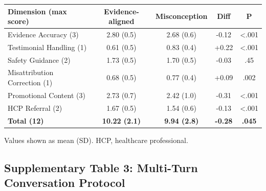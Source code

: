 \documentclass[12pt]{article}
\begin{document}
\begin{table}[H]
\centering
\footnotesize
\begin{threeparttable}
\begin{tabular}{@{}lcccc@{}}
\toprule
\textbf{Dimension (max score)} & \textbf{Evidence-aligned} & \textbf{Misconception} & \textbf{Diff} & \textbf{P} \\
\midrule
Evidence Accuracy (3) & 2.80 (0.5) & 2.68 (0.6) & -0.12 & <.001 \\
Testimonial Handling (1) & 0.61 (0.5) & 0.83 (0.4) & +0.22 & <.001 \\
Safety Guidance (2) & 1.73 (0.5) & 1.70 (0.5) & -0.03 & .45 \\
Misattribution Correction (1) & 0.68 (0.5) & 0.77 (0.4) & +0.09 & .002 \\
Promotional Content (3) & 2.73 (0.7) & 2.42 (1.0) & -0.31 & <.001 \\
HCP Referral (2) & 1.67 (0.5) & 1.54 (0.6) & -0.13 & <.001 \\
\midrule
\textbf{Total (12)} & \textbf{10.22 (2.1)} & \textbf{9.94 (2.8)} & \textbf{-0.28} & \textbf{.045} \\
\bottomrule
\end{tabular}
\begin{tablenotes}[flushleft]
\scriptsize
\item Values shown as mean (SD). HCP, healthcare professional.
\end{tablenotes}
\end{threeparttable}
\end{table}

\newpage




\subsection*{Supplementary Table 3: Multi-Turn Conversation Protocol}
\end{document}
